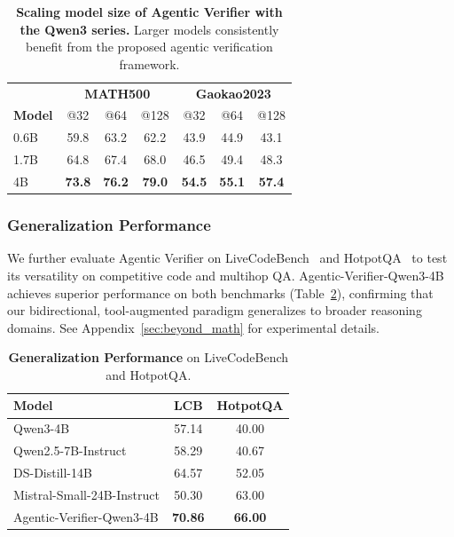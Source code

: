 \documentclass[11pt]{article}
\begin{document}
\begin{table}[t]
\centering
\small
\setlength{\tabcolsep}{6pt}
\begin{tabular}{l|ccc|ccc}
\toprule
 & \multicolumn{3}{c|}{\textbf{MATH500}} & \multicolumn{3}{c}{\textbf{Gaokao2023}} \\
\textbf{Model} & @32 & @64 & @128 & @32 & @64 & @128 \\
\midrule
0.6B & 59.8 & 63.2 & 62.2 & 43.9 & 44.9 & 43.1 \\
1.7B & 64.8 & 67.4 & 68.0 & 46.5 & 49.4 & 48.3 \\
4B   & \textbf{73.8} & \textbf{76.2} & \textbf{79.0} 
     & \textbf{54.5} & \textbf{55.1} & \textbf{57.4} \\
\bottomrule
\end{tabular}
\caption{
\textbf{Scaling model size of Agentic Verifier with the Qwen3 series.}
Larger models consistently benefit from the proposed agentic verification framework.}
\vspace{-1mm}
\label{tab:bon_model_scale}
\end{table}

\subsubsection{Generalization Performance}
We further evaluate Agentic Verifier on LiveCodeBench~\cite{jain2024livecodebench} and HotpotQA~\cite{yang2018hotpotqa} to test its versatility on competitive code and multihop QA. 
Agentic-Verifier-Qwen3-4B achieves superior performance on both benchmarks (Table~\ref{tab:generalization}), confirming that our bidirectional, tool-augmented paradigm generalizes to broader reasoning domains. See Appendix~\ref{sec:beyond_math} for experimental details.

\begin{table}[t]
\centering
\small
\setlength{\tabcolsep}{10pt}
\begin{tabular}{lcc}
\toprule
Model & LCB & HotpotQA \\
\midrule
Qwen3-4B & 57.14 & 40.00 \\
Qwen2.5-7B-Instruct & 58.29 & 40.67 \\
DS-Distill-14B & 64.57 & 52.05 \\
Mistral-Small-24B-Instruct & 50.30 & 63.00 \\
Agentic-Verifier-Qwen3-4B & \textbf{70.86} & \textbf{66.00} \\
\bottomrule
\end{tabular}
\caption{\textbf{Generalization Performance} on LiveCodeBench and HotpotQA.}
\label{tab:generalization}
\end{table}
\end{document}
